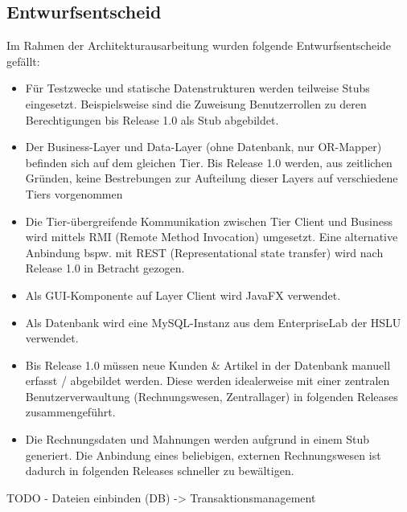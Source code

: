 \subsection{Entwurfsentscheid}
Im Rahmen der Architekturausarbeitung wurden folgende Entwurfsentscheide gefällt:
\begin{itemize}
	\item Für Testzwecke und statische Datenstrukturen werden teilweise Stubs eingesetzt. Beispielsweise sind die Zuweisung Benutzerrollen zu deren Berechtigungen bis Release 1.0 als Stub abgebildet.
	\item Der Business-Layer und Data-Layer (ohne Datenbank, nur OR-Mapper) befinden sich auf dem gleichen Tier. Bis Release 1.0 werden, aus zeitlichen Gründen, keine Bestrebungen zur Aufteilung dieser Layers auf verschiedene Tiers vorgenommen
	\item Die Tier-übergreifende Kommunikation zwischen Tier Client und Business wird mittels RMI (Remote Method Invocation) umgesetzt. Eine alternative Anbindung bspw. mit REST (Representational state transfer) wird nach Release 1.0 in Betracht gezogen.
	\item Als GUI-Komponente auf Layer Client wird JavaFX verwendet.
	\item Als Datenbank wird eine MySQL-Instanz aus dem EnterpriseLab der HSLU verwendet.
	\item Bis Release 1.0 müssen neue Kunden \& Artikel in der Datenbank manuell erfasst / abgebildet werden. Diese werden idealerweise mit einer zentralen Benutzerverwaultung (Rechnungswesen, Zentrallager) in folgenden Releases zusammengeführt.
	\item Die Rechnungsdaten und Mahnungen werden aufgrund in einem Stub generiert. Die Anbindung eines beliebigen, externen Rechnungswesen ist dadurch in folgenden Releases schneller zu bewältigen.
\end{itemize}


TODO
- Dateien einbinden (DB) -> Transaktionsmanagement

